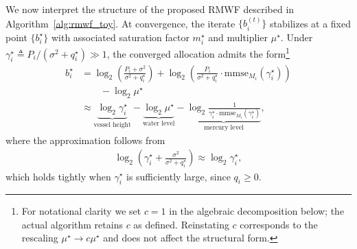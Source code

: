 \documentclass[10pt, twocolumn, comsoc]{IEEEtran}
\begin{document}
We now interpret the structure of the proposed RMWF described in Algorithm~\ref{alg:rmwf_toy}.
At convergence, the iterate $\{b_i^{(t)}\}$ stabilizes at a fixed point $\{b_i^{\star}\}$ with associated saturation factor $m_i^{\star}$ and multiplier $\mu^{\star}$. 
Under $\gamma_i^\star \triangleq P_i / (\sigma^2 + q_i^\star) \gg 1$, 
the converged allocation admits the form\footnote{For notational clarity 
we set $c=1$ in the algebraic decomposition below; the actual algorithm 
retains $c$ as defined.
Reinstating $c$ corresponds to the rescaling 
$\mu^\star \to c\mu^\star$ and does not affect the structural form.}
\begin{align} 
  b_i^{\star} 
  &= \log_2{\left(\frac{P_i + \sigma^2}{\sigma^2+q_i^\star}\right)} + \log_2{\left(\frac{P_i}{\sigma^2+q_i^\star} \cdot \mathrm{mmse}_{M_i}(\gamma_i^\star)
  \right)} \nonumber \\
  &\qquad - \log_2 \mu^{\star} \\
  &\approx 
  \underbrace{\log_2{\gamma_i^\star}}_{\text{vessel height}}
  - \underbrace{\log_2 \mu^{\star}}_{\text{water level}}
  - \underbrace{\log_2{\frac{1}{\gamma_i^\star \cdot \mathrm{mmse}_{M_i}(\gamma_i^\star)}}}_{\text{mercury level}}, \label{eq:rmwf_sol}
\end{align}
where the approximation follows from 
\begin{align}
    \log_2{\left(\gamma_i^\star + \frac{\sigma^2}{\sigma^2 + q_i^\star}\right)} 
    \approx \log_2 \gamma_i^\star,
\end{align}
which holds tightly when $\gamma_i^\star$ is sufficiently large, since $q_i \ge 0$.
\end{document}
